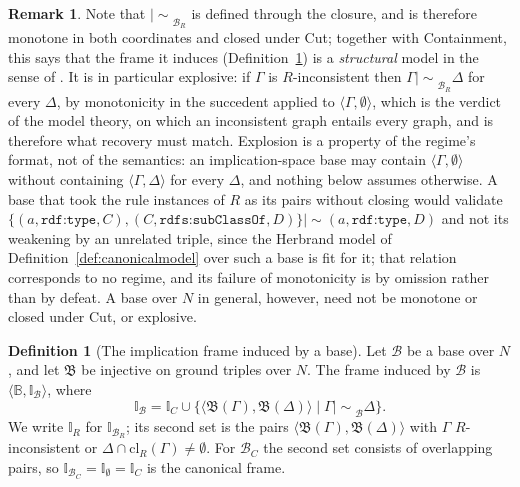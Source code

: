 \documentclass[12pt]{article}
\newcommand{\B}{\mathbb{B}}   %
\newcommand{\I}{\mathbb{I}}
\newcommand{\imp}{\mathrel{\mid\!\sim}}
\theoremstyle{definition}
\newtheorem{definition}{Definition}
\newtheorem{remark}{Remark}
\newcommand{\tuple}[1]{\langle #1 \rangle}
\newcommand{\bmap}{\mathfrak{B}}  %
\newcommand{\Bcal}{\mathcal{B}}   %
\newcommand{\cl}{\mathrm{cl}}   %
\begin{document}
\begin{remark}
\label{rem:omission}
Note that $\imp_{\Bcal_R}$ is defined through the closure, and is therefore monotone in both coordinates and closed under Cut; together with Containment, this says that the frame it induces (Definition~\ref{def:inducedframe}) is a \textit{structural} model in the sense of \citet[Def.~30]{hlobil2026firstorder}. It is in particular explosive: if $\Gamma$ is $R$-inconsistent then $\Gamma \imp_{\Bcal_R} \Delta$ for every $\Delta$, by monotonicity in the succedent applied to $\tuple{\Gamma, \emptyset}$, which is the verdict of the model theory, on which an inconsistent graph entails every graph, and is therefore what recovery must match. Explosion is a property of the regime's format, not of the semantics: an implication-space base may contain $\tuple{\Gamma, \emptyset}$ without containing $\tuple{\Gamma, \Delta}$ for every $\Delta$, and nothing below assumes otherwise.
A base that took the rule instances of $R$ as its pairs without closing would validate $\{(a, \texttt{rdf:type}, C), (C, \texttt{rdfs:subClassOf}, D)\} \imp (a, \texttt{rdf:type}, D)$ and not its weakening by an unrelated triple, since the Herbrand model of Definition~\ref{def:canonicalmodel} over such a base is fit for it; that relation corresponds to no regime, and its failure of monotonicity is by omission rather than by defeat. A base over $N$ in general, however, need not be monotone or closed under Cut, or explosive.  
\end{remark}

\begin{definition}[The implication frame induced by a base]
\label{def:inducedframe}
Let $\Bcal$ be a base over $N$, and let $\bmap$ be injective on ground triples over $N$. The frame induced by $\Bcal$ is $\tuple{\B, \I_{\Bcal}}$, where
\[
\I_{\Bcal} = \I_{C} \cup \bigl\{\tuple{\bmap(\Gamma), \bmap(\Delta)} \mid \Gamma \imp_\Bcal \Delta\bigr\}.
\]
We write $\I_{R}$ for $\I_{\Bcal_{R}}$; its second set is the pairs $\tuple{\bmap(\Gamma), \bmap(\Delta)}$ with $\Gamma$ $R$-inconsistent or $\Delta \cap \cl_R(\Gamma) \neq \emptyset$. For $\Bcal_{C}$ the second set consists of overlapping pairs, so $\I_{\Bcal_C} = \I_{\emptyset} = \I_{C}$ is the canonical frame.
\end{definition}
\end{document}
